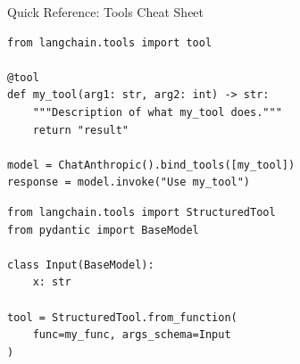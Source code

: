 \documentclass[aspectratio=169,11pt]{beamer}
\begin{document}
\begin{frame}[fragile,shrink=2]{Quick Reference: Tools Cheat Sheet}
\begin{codebox}
\begin{lstlisting}
from langchain.tools import tool

@tool
def my_tool(arg1: str, arg2: int) -> str:
    """Description of what my_tool does."""
    return "result"

model = ChatAnthropic().bind_tools([my_tool])
response = model.invoke("Use my_tool")
\end{lstlisting}
\end{codebox}

\begin{codebox}
\begin{lstlisting}
from langchain.tools import StructuredTool
from pydantic import BaseModel

class Input(BaseModel):
    x: str

tool = StructuredTool.from_function(
    func=my_func, args_schema=Input
)
\end{lstlisting}
\end{codebox}
\end{frame}
\end{document}
